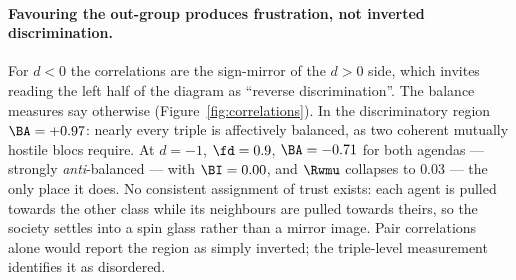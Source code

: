 \paragraph{Favouring the out-group produces frustration, not inverted
discrimination.} For $d<0$ the correlations are the sign-mirror of the $d>0$ side,
which invites reading the left half of the diagram as ``reverse discrimination''.
The balance measures say otherwise (Figure~\ref{fig:correlations}). In the
discriminatory region $\BA=+0.97$: nearly every triple is affectively balanced, as
two coherent mutually hostile blocs require. At $d=-1$, $\fd=0.9$,
$\BA=-0.71$ for both agendas --- strongly \emph{anti}-balanced --- with
$\BI=0.00$, and $\Rwmu$ collapses to $0.03$ --- the only place it does. No
consistent assignment of trust exists: each agent is pulled towards the other class
while its neighbours are pulled towards theirs, so the society settles into a spin
glass rather than a mirror image. Pair correlations alone would report the region as
simply inverted; the triple-level measurement identifies it as disordered.

